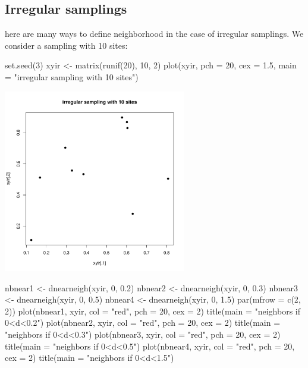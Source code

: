 \documentclass[a4paper]{article}
\begin{document}
\subsection{Irregular samplings}
here are many ways to define neighborhood in the case of irregular samplings. We consider a sampling with 10 sites:
\begin{Schunk}
\begin{Sinput}
 set.seed(3)
 xyir <- matrix(runif(20), 10, 2)
 plot(xyir, pch = 20, cex = 1.5, main = "irregular sampling with 10 sites")
\end{Sinput}
\end{Schunk}
\begin{center}
\includegraphics[width=0.6\textwidth,keepaspectratio]{figs/tutorial-ni6}
\end{center}
\begin{Schunk}
\begin{Sinput}
 nbnear1 <- dnearneigh(xyir, 0, 0.2)
 nbnear2 <- dnearneigh(xyir, 0, 0.3)
 nbnear3 <- dnearneigh(xyir, 0, 0.5)
 nbnear4 <- dnearneigh(xyir, 0, 1.5)
 par(mfrow = c(2, 2))
 plot(nbnear1, xyir, col = "red", pch = 20, cex = 2)
 title(main = "neighbors if 0<d<0.2")
 plot(nbnear2, xyir, col = "red", pch = 20, cex = 2)
 title(main = "neighbors if 0<d<0.3")
 plot(nbnear3, xyir, col = "red", pch = 20, cex = 2)
 title(main = "neighbors if 0<d<0.5")
 plot(nbnear4, xyir, col = "red", pch = 20, cex = 2)
 title(main = "neighbors if 0<d<1.5")
\end{Sinput}
\end{Schunk}
\end{document}
